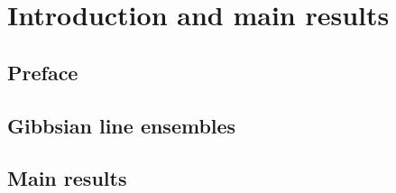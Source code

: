 %
\section{Introduction and main results}\label{Section1}

\subsection{Preface}

\subsection{Gibbsian line ensembles}

\subsection{Main results}



